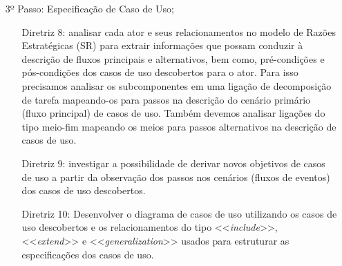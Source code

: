 \begin{enumerate}
                \item[3º Passo:] Especificação de Caso de Uso;
                \begin{enumerate}
                    \item[Diretriz 8:] analisar cada ator e seus relacionamentos no modelo de Razões Estratégicas (SR) para extrair informações que possam conduzir à descrição de fluxos principais e alternativos, bem como, pré-condições e pós-condições dos casos de uso descobertos para o ator.
                    Para isso precisamos analisar os subcomponentes em uma ligação de decomposição de tarefa mapeando-os para passos na descrição do cenário primário (fluxo principal) de casos de uso.
                    Também devemos analisar ligações do tipo meio-fim mapeando os meios para passos alternativos na descrição de casos de uso.
                    \item[Diretriz 9:] investigar a possibilidade de derivar novos objetivos de casos de uso a partir da observação dos passos nos cenários (fluxos de eventos) dos casos de uso descobertos.
                    \item[Diretriz 10:] Desenvolver o diagrama de casos de uso utilizando os casos de uso descobertos e os relacionamentos do tipo <<\emph{include}>>, <<\emph{extend}>> e <<\emph{generalization}>> usados para estruturar as especificações dos casos de uso.
                \end{enumerate}
            \end{enumerate}

